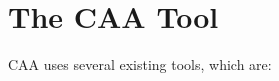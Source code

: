 \documentclass{sig-alternate}
\begin{document}




\section{The CAA Tool}
\label{sec: caa}

CAA uses several existing tools, which are:


\end{document}
